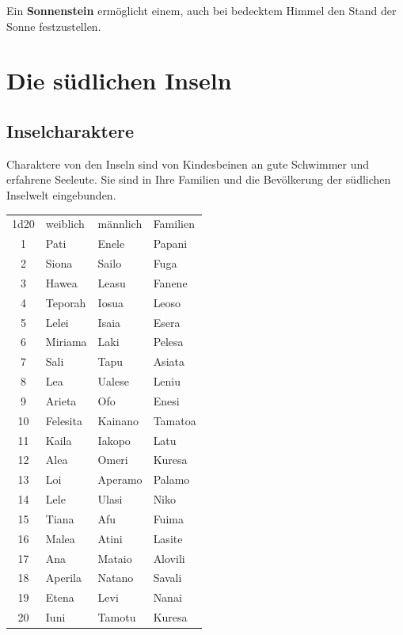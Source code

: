 \documentclass[11pt]{wbzine}
\begin{document}
\begin{multicols}{2}

    Ein \textbf{Sonnenstein} ermöglicht einem, auch bei bedecktem
    Himmel den Stand der Sonne festzustellen.


\section{Die südlichen Inseln}



\subsection{Inselcharaktere}

Charaktere von den Inseln sind von Kindesbeinen an gute Schwimmer
und erfahrene Seeleute. Sie sind in Ihre Familien und die
Bevölkerung der südlichen Inselwelt eingebunden.

\begin{tabularx}{\columnwidth}{clll}
    1d20 &  weiblich    &    männlich    &    Familien \\
    1   &    Pati       &     Enele      &     Papani \\
    2    &   Siona      &     Sailo      &     Fuga\\
    3   &    Hawea      &     Leasu      &     Fanene\\
    4    &   Teporah    &     Iosua      &     Leoso\\
    5     &  Lelei      &     Isaia      &     Esera\\
    6     &  Miriama   &      Laki       &     Pelesa\\
    7     &  Sali      &      Tapu       &     Asiata\\
    8     &  Lea       &      Ualese     &     Leniu\\
    9      & Arieta    &      Ofo        &     Enesi\\
    10     & Felesita  &      Kainano    &     Tamatoa\\
    11     & Kaila     &      Iakopo     &     Latu\\
    12    &  Alea      &      Omeri      &     Kuresa\\
    13    &  Loi       &      Aperamo    &     Palamo\\
    14    &  Lele      &      Ulasi      &     Niko\\
    15     & Tiana     &      Afu        &     Fuima\\
    16     & Malea     &      Atini      &     Lasite\\
    17     & Ana       &      Mataio     &     Alovili\\
    18     & Aperila   &      Natano     &     Savali\\
    19     & Etena     &      Levi       &     Nanai\\
    20     & Iuni      &      Tamotu     &     Kuresa\\
\end{tabularx}


\end{multicols}
\end{document}
